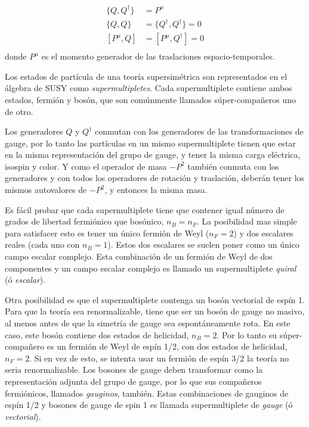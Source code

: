 \begin{align}
  \{Q, Q^\dagger\} &= P^\mu \\ \{Q, Q\} &= \{Q^\dagger, Q^\dagger\} = 0
  \\ [P^\mu, Q] &= [P^\mu, Q^\dagger] = 0 \\
\end{align}
%
donde $P^\mu$ es el momento generador de las traslaciones
espacio-temporales.

Los estados de partícula de una teoría supersimétrica son representados en el
álgebra de SUSY como \emph{supermultipletes}. Cada supermultiplete contiene
ambos estados, fermión y bosón, que son comúnmente llamados súper-compa\~neros
uno de otro.

Los generadores $Q$ y $Q^\dagger$ conmutan con los generadores de las
transformaciones de gauge, por lo tanto las partículas en un mismo
supermultiplete tienen que estar en la misma representación del grupo de gauge,
y tener la misma carga eléctrica, isospin y color. Y como el operador de masa
$-P^2$ también conmuta con los generadores y con todos los operadores de
rotación y traslación, deberán tener los mismos autovalores de $-P^2$, y
entonces la misma masa.

Es fácil probar que cada supermultiplete tiene que contener igual número de
grados de libertad fermiónico que bosónico, $n_B = n_F$. La posibilidad mas
simple para satisfacer esto es tener un único fermión de Weyl ($n_F=2$) y dos
escalares reales (cada uno con $n_B=1$). Estos dos escalares se suelen poner
como un único campo escalar complejo. Esta combinación de un fermión de Weyl de
dos componentes y un campo escalar complejo es llamado un supermultiplete
\emph{quiral} (ó \emph{escalar}).

Otra posibilidad es que el supermultiplete contenga un bosón vectorial de espín
1. Para que la teoría sea renormalizable, tiene que ser un bosón de gauge no
masivo, al menos antes de que la simetría de gauge sea espontáneamente rota. En
este caso, este bosón contiene dos estados de helicidad, $n_B=2$. Por lo tanto
su súper-compa\~nero es un fermión de Weyl de espín 1/2, con dos estados de
helicidad, $n_F=2$. Si en vez de esto, se intenta usar un fermión de espín 3/2
la teoría no seria renormalizable. Los bosones de gauge deben transformar como
la representación adjunta del grupo de gauge, por lo que sus compañeros
fermiónicos, llamados \emph{gauginos}, también. Estas combinaciones de gauginos
de espín 1/2 y bosones de gauge de spin 1 es llamada supermultiplete de
\emph{gauge} (ó \emph{vectorial}).

